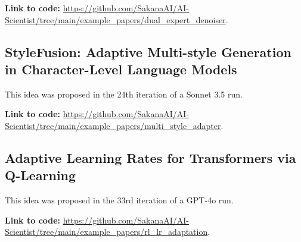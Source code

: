 \documentclass[11pt, a4paper]{include/gdm_format}
\begin{document}
\textbf{Link to code:} \url{https://github.com/SakanaAI/AI-Scientist/tree/main/example_papers/dual_expert_denoiser}.


\label{paper:dual_expert_denoiser}
\begin{tcolorbox}[breakable, colback=green!5!white, colframe=green!75!black, title=Review]
{\small  }
\end{tcolorbox}

\clearpage
%
\subsection{StyleFusion: Adaptive Multi-style Generation in Character-Level Language Models}

This idea was proposed in the 24th iteration of a Sonnet 3.5 run.

\begin{tcolorbox}[colback=blue!5!white, colframe=blue!75!black, title=Idea]
{\small  }
\end{tcolorbox}

\textbf{Link to code:} \url{https://github.com/SakanaAI/AI-Scientist/tree/main/example_papers/multi_style_adapter}.


\label{paper:multi_style_adapter}
\begin{tcolorbox}[breakable, colback=green!5!white, colframe=green!75!black, title=Review]
{\small  }
\end{tcolorbox}

\clearpage
%
\subsection{Adaptive Learning Rates for Transformers via Q-Learning}

This idea was proposed in the 33rd iteration of a GPT-4o run.

\begin{tcolorbox}[colback=blue!5!white, colframe=blue!75!black, title=Idea]
{\small  }
\end{tcolorbox}

\textbf{Link to code:} \url{https://github.com/SakanaAI/AI-Scientist/tree/main/example_papers/rl_lr_adaptation}.
\end{document}
